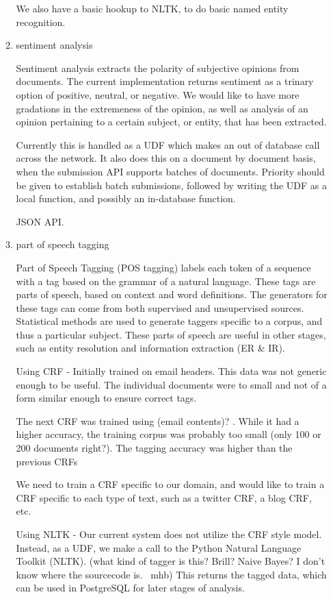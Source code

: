 \documentclass{article}
\begin{document}
\begin{enumerate}
\begin{enumerate}
    We also have a basic hookup to NLTK, to do basic named entity recognition.

  \item sentiment analysis

    Sentiment analysis extracts the polarity of subjective opinions from documents.
    The current implementation returns sentiment as a trinary option of positive, neutral, or negative.
    We would like to have more gradations in the extremeness of the opinion,
    as well as analysis of an opinion pertaining to a certain subject, or entity, that has been extracted.

    Currently this is handled as a UDF which makes an out of database call across the network.
    It also does this on a document by document basis,
    when the submission API supports batches of documents.
    Priority should be given to establish batch submissions,
    followed by writing the UDF as a local function,
    and possibly an in-database function.

    JSON API.


  \item part of speech tagging

    Part of Speech Tagging (POS tagging) labels each token of a sequence with a tag based on the grammar of a natural language.
    These tags are parts of speech, based on context and word definitions.
    The generators for these tags can come from both supervised and unsupervised sources.
    Statistical methods are used to generate taggers specific to a corpus, and thus a particular subject.
    These parts of speech are useful in other stages, such as entity resolution and information extraction (ER \& IR).

    Using CRF -
    Initially trained on email headers.
    This data was not generic enough to be useful.
    The individual documents were to small and not of a form similar enough to ensure correct tags.

    The next CRF was trained using (email contents)? .
    While it had a higher accuracy, the training corpus was probably too small (only 100 or 200 documents right?).
    The tagging accuracy was higher than the previous CRFs

    We need to train a CRF specific to our domain,
    and would like to train a CRF specific to each type of text,
    such as a twitter CRF, a blog CRF, etc.

    Using NLTK -
    Our current system does not utilize the CRF style model.
    Instead, as a UDF, we make a call to the Python Natural Language Toolkit (NLTK).
    (what kind of tagger is this? Brill? Naive Bayes? I don't know where the sourcecode is. ~mhb)
    This returns the tagged data, which can be used in PostgreSQL for later stages of analysis.



\end{enumerate}
\end{enumerate}
\end{document}
